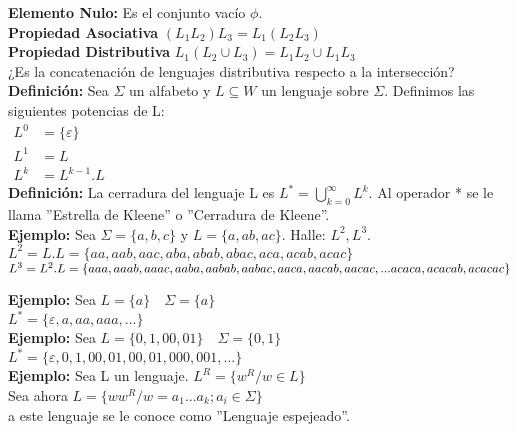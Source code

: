 \textbf{Elemento Nulo: }Es el conjunto vacío $\phi$.\\

\textbf{Propiedad Asociativa } $(L_1 L_2)L_3=L_1(L_2 L_3)$\\

\textbf{Propiedad Distributiva }$L_1(L_2\cup L_3)=L_1 L_2 \cup L_1 L_3$\\

¿Es la concatenación de lenguajes distributiva respecto a la intersección?\\

\textbf{Definición: }Sea $\Sigma$ un alfabeto y $L\subseteq W$ un lenguaje sobre $\Sigma$. Definimos las siguientes potencias de L:\\

$\begin{array}{rl}
L^0 &= \lbrace \varepsilon \rbrace\\
L^1 &=L \\
L^k &=L^{k-1}.L
\end{array}$\\

\textbf{Definición: }La cerradura del lenguaje L es $L^* =\bigcup_{k=0}^\infty L^k$. Al operador * se le llama ''Estrella de Kleene'' o ''Cerradura de Kleene''.\\

\textbf{Ejemplo: }Sea $\Sigma=\lbrace a,b,c\rbrace$ y $L=\lbrace a,ab,ac\rbrace$. Halle: $L^2, L^3$.\\

$L^2=L.L=\lbrace aa,aab,aac,aba,abab,abac,aca,acab,acac \rbrace$\\
$L^3=L^2 .L=\lbrace aaa,aaab,aaac,aaba,aabab,aabac,\\ aaca,aacab,aacac,...acaca,acacab,acacac \rbrace$

\textbf{Ejemplo: }Sea $L=\lbrace a\rbrace \quad \Sigma =\lbrace a \rbrace$\\
$L^* =\lbrace \varepsilon, a,aa,aaa,... \rbrace$\\

\textbf{Ejemplo: }Sea $L=\lbrace 0,1,00,01 \rbrace \quad \Sigma = \lbrace 0,1\rbrace$\\
$L^* = \lbrace \varepsilon , 0,1,00,01,00,01,000,001,... \rbrace$\\

\textbf{Ejemplo: }Sea L un lenguaje. $L^R=\lbrace w^R/ w\in L\rbrace$\\
Sea ahora $L=\lbrace ww^R/w=a_1...a_k ; a_i \in \Sigma \rbrace$\\
a este lenguaje se le conoce como ''Lenguaje espejeado''. %

